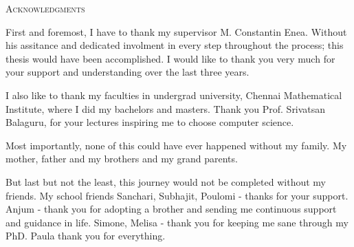 \begin{center}
    \textsc{Acknowledgments}
  \end{center}
  \noindent

First and foremost, I have to thank my supervisor M. Constantin Enea. Without his assitance and dedicated involment in every step throughout the process; this thesis would have been accomplished. I would like to thank you very much for your support and understanding over the last three years.


I also like to thank my faculties in undergrad university, Chennai Mathematical Institute, where I did my bachelors and masters. Thank you Prof. Srivatsan Balaguru, for your lectures inspiring me to choose computer science. 

Most importantly, none of this could have ever happened without my family. My mother, father and my brothers and my grand parents. 

But last but not the least, this journey would not be completed without my friends. My school friends Sanchari, Subhajit, Poulomi - thanks for your support. Anjum - thank you for adopting a brother and sending me continuous support and guidance in life. Simone, Melisa - thank you for keeping me sane through my PhD. Paula thank you for everything.

  